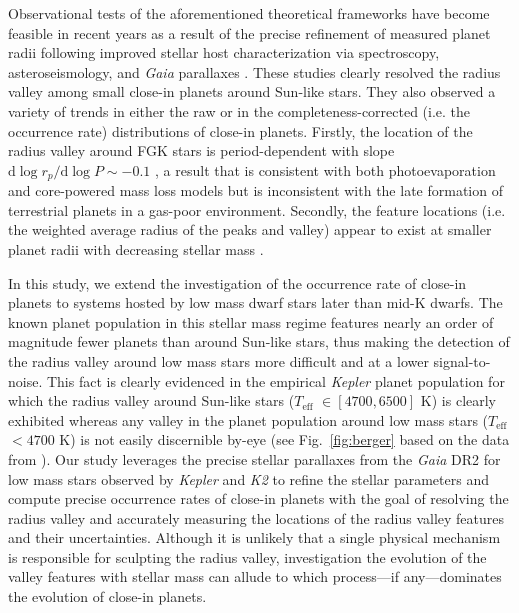 \documentclass[twocolumn]{emulateapj}
\newcommand{\gaia}[1]{\emph{Gaia}#1}
\newcommand{\kepler}[1]{\emph{Kepler}#1}
\newcommand{\ktwo}[1]{\emph{K2}#1}
\newcommand{\teff}[1]{$T_{\text{eff}}$#1}
\begin{document}
Observational tests of the aforementioned theoretical frameworks have become feasible in recent years as a result 
of the precise refinement of measured planet radii following improved stellar host characterization via  
spectroscopy, asteroseismology, and \gaia{} parallaxes
\citep[e.g.][]{fulton17,vaneylen18,fulton18,martinez19}. These studies clearly resolved the radius valley 
among small close-in planets around Sun-like stars. They also observed a variety of trends in either
the raw or in the completeness-corrected (i.e. the occurrence rate) distributions of close-in planets. Firstly,
the location of the radius valley around FGK stars is period-dependent with slope
$\mathrm{d}\log{r_p} / \mathrm{d}\log{P} \sim -0.1$ \citep{vaneylen18,martinez19}, a result that is consistent
with both photoevaporation and core-powered mass loss models but is inconsistent with the late formation of
terrestrial planets in a gas-poor environment. Secondly, the feature locations (i.e. the weighted
average radius of the peaks and valley) appear to exist at smaller planet radii with decreasing stellar
mass \citep{fulton18,wu19}.

In this study, we extend the investigation of the occurrence rate of close-in planets to systems hosted by
low mass dwarf stars
later than mid-K dwarfs. The known planet population in this stellar mass regime features nearly an order of magnitude
fewer planets than around Sun-like stars, thus making the detection of the radius valley around low mass stars more
difficult and at a lower signal-to-noise. This fact is clearly evidenced in the empirical \kepler{} planet population
for which the radius valley around Sun-like stars (\teff{} $\in [4700,6500]$ K) is clearly exhibited whereas any valley
in the planet population around low mass stars (\teff{} $< 4700$ K) is not easily discernible by-eye (see
Fig.~\ref{fig:berger} based on the data from \citealt{berger18}).
Our study leverages the precise stellar parallaxes from the \gaia{} DR2
for low mass stars observed by \kepler{} and \ktwo{} to refine the stellar parameters and compute precise
occurrence rates of close-in planets with the goal of resolving the radius valley and accurately measuring the
locations of the radius valley features and their uncertainties. Although it is unlikely that a single physical
mechanism is responsible for sculpting the radius valley, investigation the evolution of the valley features with
stellar mass can allude to which process---if any---dominates the evolution of close-in planets.
\end{document}
